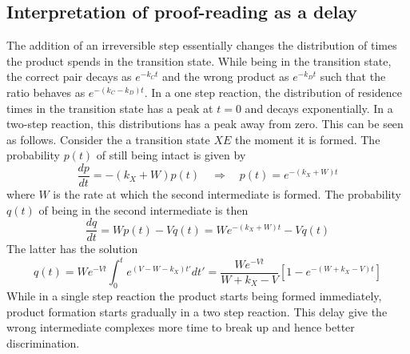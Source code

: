 \subsection*{Interpretation of proof-reading as a delay}
The addition of an irreversible step essentially changes the distribution of times the product spends in the transition state.
While being in the transition state, the correct pair decays as $e^{-k_Ct}$ and the wrong product as $e^{-k_Dt}$ such that the ratio behaves as $e^{-(k_C-k_D)t}$.
In a one step reaction, the distribution of residence times in the transition state has a peak at $t=0$ and decays exponentially. In a two-step reaction, this distributions has a peak away from zero.
This can be seen as follows.
Consider the a transition state $XE$ the moment it is formed. The probability $p(t)$ of still being intact is given by
\begin{equation}
\frac{dp}{dt} = - (k_X + W)p(t) \quad \Rightarrow\quad p(t) = e^{-(k_X+W)t}
\end{equation}
where $W$ is the rate at which the second intermediate is formed.
The probability $q(t)$ of being in the second intermediate is then
\begin{equation}
\frac{dq}{dt} = Wp(t) - Vq(t) = We^{-(k_X+W)t} - Vq(t)
\end{equation}
The latter has the solution
\begin{equation}
q(t) = We^{-Vt}\int_0^t e^{(V-W-k_X)t'} dt' = \frac{We^{-Vt}}{W+k_X-V}\left[1-e^{-(W+k_X - V)t}\right]
\end{equation}
While in a single step reaction the product starts being formed immediately, product formation starts gradually in a two step reaction.
This delay give the wrong intermediate complexes more time to break up and hence better discrimination.
